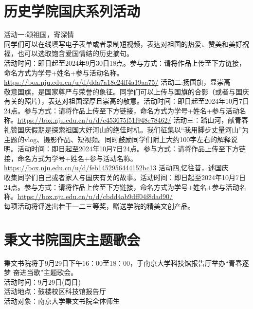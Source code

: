 \documentclass[letterpaper, 12pt]{article}
\begin{document}
\begin{multicols}{2}
\section{历史学院国庆系列活动}
活动一:颂祖国，寄深情\\
同学们可以在线填写电子表单或者录制短视频，表达对祖国的热爱、赞美和美好祝福，也可以选取饱含爱国情结的历史摘句。\\活动时间：即日起至2024年9月30日18点。参与方式：请将作品上传至下方链接，命名方式为学号+姓名+参与活动名称。\\\url{https://box.nju.edu.cn/u/d/dda7a18c24ff4a19aa75/}
活动二:扬国旗，显崇高\\
敬意国旗，是国家尊严与荣誉的象征。同学们可以上传与国旗的合影（或者与国庆有关的照片），表达对祖国深厚且崇高的敬意。活动时间：即日起至2024年10月7日24点。参与方式：请将作品上传至下方链接，命名方式为学号+姓名+参与活动名称。\url{https://box.nju.edu.cn/u/d/e453675f51f948e78462/}
活动三：踏山河，献青春\\
礼赞国庆假期是探索祖国大好河山的绝佳时机。我们征集以“我用脚步丈量河山”为主题的vlog、摄影作品、短视频。同时鼓励同学们附上大约100字左右的解释说明。活动时间：即日起至2024年10月7日24点。参与方式：请将作品上传至下方链接，命名方式为学号+姓名+参与活动名称。\url{https://box.nju.edu.cn/u/d/feb1452956444152bc13}
活动四,忆往昔，述国庆\\
收集同学们自己或者家人与国庆有关的故事。活动时间：即日起至2024年10月7日24点。参与方式：请将作品上传至下方链接，命名方式为学号+姓名+参与活动名称。\url{https://box.nju.edu.cn/u/d/cbdd4ab9dff04f8dad90/}
\\每项活动将评选出若干一二三等奖，赠送学院的精美文创产品。
\section{秉文书院国庆主题歌会}
秉文书院将于9月29日下午16：00至18：00，于南京大学科技馆报告厅举办“青春逐梦 奋进当歌”主题歌会。
\\活动时间：9月29日(周日)
\\活动地点：鼓楼校区科技馆报告厅
\\活动对象：南京大学秉文书院全体师生
\end{multicols} 
\end{document}
